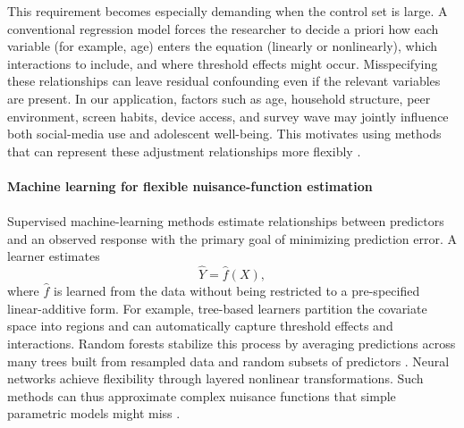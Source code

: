 \documentclass[11pt,oneside,a4paper]{book}
\begin{document}
This requirement becomes especially demanding when the control set is large. A conventional regression model forces the researcher to decide a priori how each variable (for example, age) enters the equation (linearly or nonlinearly), which interactions to include, and where threshold effects might occur. Misspecifying these relationships can leave residual confounding even if the relevant variables are present. In our application, factors such as age, household structure, peer environment, screen habits, device access, and survey wave may jointly influence both social-media use and adolescent well-being. This motivates using methods that can represent these adjustment relationships more flexibly \citep{athey2019mlmethods,fuhr2024dml,helal2026returns}.\\
\\
\textbf{Machine learning for flexible nuisance-function estimation}\\
\\
Supervised machine-learning methods estimate relationships between predictors and an observed response with the primary goal of minimizing prediction error. A learner estimates
\begin{equation*}
\widehat{Y} = \widehat{f}(X),
\end{equation*}
where \(\widehat{f}\) is learned from the data without being restricted to a pre-specified linear-additive form. For example, tree-based learners partition the covariate space into regions and can automatically capture threshold effects and interactions. Random forests stabilize this process by averaging predictions across many trees built from resampled data and random subsets of predictors \citep{athey2019mlmethods}. Neural networks achieve flexibility through layered nonlinear transformations. Such methods can thus approximate complex nuisance functions that simple parametric models might miss \citep{mullainathan2017machine,helal2026returns}.
\end{document}
